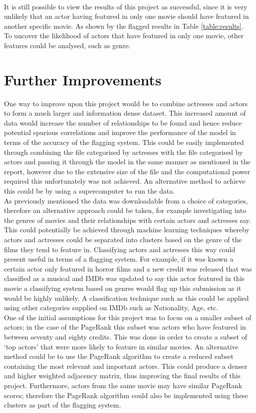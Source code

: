 \documentclass[12pt]{ieeeconf}      %
\begin{document}
\\
\indent It is still possible to view the results of this project as successful, since it is very unlikely that an actor having featured in only one movie should have featured in another specific movie. As shown by the flagged results in Table \ref{table:results}. To uncover the likelihood of actors that have featured in only one movie, other features could be analysed, such as genre. 


\section{Further Improvements}
\indent One way to improve upon this project would be to combine actresses and actors to form a much larger and information dense dataset. This increased amount of data would increase the number of relationships to be found and hence reduce potential spurious correlations and improve the performance of the model in terms of the accuracy of the flagging system. This could be easily implemented through combining the file categorised by actresses with the file categorised by actors and passing it through the model in the same manner as mentioned in the report, however due to the extensive size of the file and the computational power required this unfortunately was not achieved.  An alternative method to achieve this could be by using a supercomputer to run the data.
\\
\indent As previously mentioned the data was downloadable from a choice of categories, therefore an alternative approach could be taken, for example investigating into the genres of movies and their relationships with certain actors and actresses say. This could potentially be achieved through machine learning techniques whereby actors and actresses could be separated into clusters based on the genre of the films they tend to feature in. Classifying actors and actresses this way could present useful in terms of a flagging system. For example, if it was known a certain actor only featured in horror films and a new credit was released that was classified as a musical and IMDb was updated to say this actor featured in this movie a classifying system based on genres would flag up this submission as it would be highly unlikely. A classification technique such as this could be applied using other categories supplied on IMDb such as Nationality, Age, etc. \\
\indent One of the initial assumptions for this project was to focus on a smaller subset of actors; in the case of the PageRank this subset was actors who have featured in between seventy and eighty credits.  This was done in order to create a subset of `top actors' that were more likely to feature in similar movies.  An alternative method could be to use the PageRank algorithm to create a reduced subset containing the most relevant and important actors.  This could produce a denser and higher weighted adjacency matrix, thus improving the final results of this project.  Furthermore, actors from the same movie may have similar PageRank scores; therefore the PageRank algorithm could also be implemented using these clusters as part of the flagging system.
\end{document}
